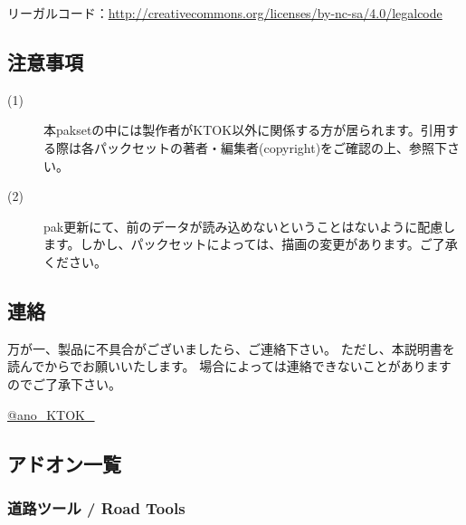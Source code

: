 \documentclass{jarticle}
\begin{document}
リーガルコード：\href{http://creativecommons.org/licenses/by-nc-sa/4.0/legalcode}{http://creativecommons.org/licenses/by-nc-sa/4.0/legalcode}

\subsection*{注意事項}

\begin{description}
  \item[(1)]
    本paksetの中には製作者がKTOK以外に関係する方が居られます。引用する際は各パックセットの著者・編集者(copyright)をご確認の上、参照下さい。
  \item[(2)]
    pak更新にて、前のデータが読み込めないということはないように配慮します。しかし、パックセットによっては、描画の変更があります。ご了承ください。
\end{description}

\subsection*{連絡}
万が一、製品に不具合がございましたら、ご連絡下さい。 ただし、本説明書を読んでからでお願いいたします。 場合によっては連絡できないことがありますのでご了承下さい。

\href{https://twitter.com/ano_KTOK_}{@ano\_KTOK\_}

\newpage

\subsection{アドオン一覧}



\subsubsection{道路ツール / Road Tools}
\end{document}
